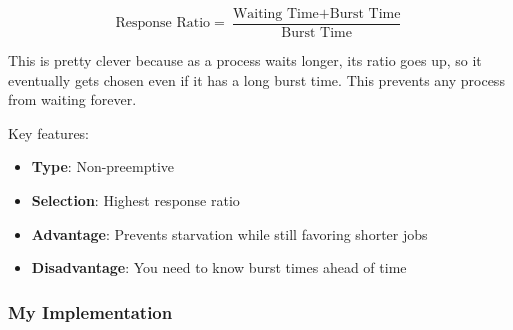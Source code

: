 \documentclass[12pt,letterpaper]{article}
\begin{document}
\[
\text{Response Ratio} = \frac{\text{Waiting Time} + \text{Burst Time}}{\text{Burst Time}}
\]

This is pretty clever because as a process waits longer, its ratio goes up, so 
it eventually gets chosen even if it has a long burst time. This prevents any 
process from waiting forever.

Key features:
\begin{itemize}
    \item \textbf{Type}: Non-preemptive
    \item \textbf{Selection}: Highest response ratio
    \item \textbf{Advantage}: Prevents starvation while still favoring shorter jobs
    \item \textbf{Disadvantage}: You need to know burst times ahead of time
\end{itemize}

\subsubsection{My Implementation}
\end{document}

